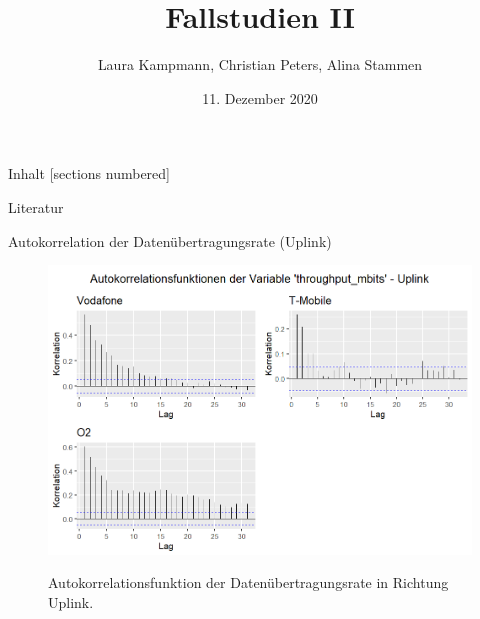 \documentclass[10pt]{beamer}
\title{Fallstudien II}
\date{11. Dezember 2020}
\author{Laura Kampmann, Christian Peters, Alina Stammen}
\begin{document}
\maketitle

\begin{frame}{Inhalt}
  [sections numbered]
  \tableofcontents
\end{frame}

%
















\appendix

\begin{frame}[allowframebreaks]{Literatur}

  
  

\end{frame}

\begin{frame}{Autokorrelation der Datenübertragungsrate (Uplink)}
	\begin{figure}
		\includegraphics[scale=0.38]{plots/arima/uplink/throughput_acf}\\
		\caption{Autokorrelationsfunktion der Datenübertragungsrate in Richtung Uplink.}
		\label{throughput_acf}
	\end{figure}
\end{frame}
\end{document}
